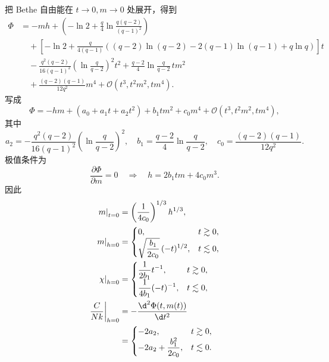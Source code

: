 把 Bethe 自由能在 \(t\to0,m\to0\) 处展开，得到
\begin{align*}
\Phi
&=-mh+
\left(-\ln2+\frac q4\ln\frac{q(q-2)}{(q-1)^2}\right)\\
&\quad+\left[
-\ln2+\frac{q}{4(q-1)}
\left((q-2)\ln(q-2)-2(q-1)\ln(q-1)+q\ln q\right)
\right]t\\
&\quad-\frac{q^2(q-2)}{16(q-1)^2}
\left(\ln\frac q{q-2}\right)^2t^2
+\frac{q-2}{4}\ln\frac q{q-2}\,tm^2\\
&\quad+\frac{(q-2)(q-1)}{12q^2}m^4
+\mathcal O(t^3,t^2m^2,tm^4).
\end{align*}
写成
\begin{equation*}
\Phi=-hm+(a_0+a_1t+a_2t^2)+b_1tm^2+c_0m^4
+\mathcal O(t^3,t^2m^2,tm^4),
\end{equation*}
其中
\begin{equation*}
	a_2=-\frac{q^2(q-2)}{16(q-1)^2}
	\left(\ln\frac q{q-2}\right)^2,\quad
	b_1=\frac{q-2}{4}\ln\frac q{q-2},\quad
	c_0=\frac{(q-2)(q-1)}{12q^2}.
\end{equation*}
极值条件为
\begin{equation*}
	\frac{\partial\Phi}{\partial m}=0
	\quad\Longrightarrow\quad
	h=2b_1tm+4c_0m^3.
\end{equation*}
因此
\begin{align*}
\left.m\right|_{t=0}
&=\left(\frac1{4c_0}\right)^{1/3}h^{1/3},\\
\left.m\right|_{h=0}
&=
\begin{cases}
	0,&t\gtrsim0,\\
\displaystyle\sqrt{\frac{b_1}{2c_0}}\,(-t)^{1/2},&t\lesssim0,
\end{cases}\\
\left.\chi\right|_{h=0}
&=
\begin{cases}
\displaystyle\frac1{2b_1}t^{-1},&t\gtrsim0,\\
\displaystyle\frac1{4b_1}(-t)^{-1},&t\lesssim0,
\end{cases}\\
\left.\frac C{Nk}\right|_{h=0}
&=-\frac{\d^2\Phi(t,m(t))}{\d t^2}\\
&=
\begin{cases}
-2a_2,&t\gtrsim0,\\
\displaystyle-2a_2+\frac{b_1^2}{2c_0},&t\lesssim0.
\end{cases}
\end{align*}
